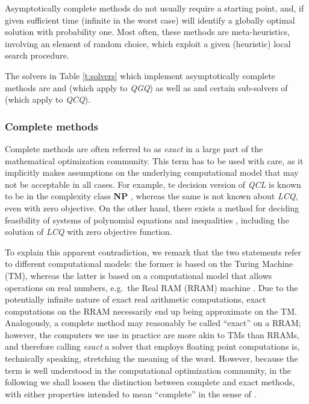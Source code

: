 Asymptotically complete methods do not usually require a starting point, and, if given sufficient time (infinite in the worst case) will identify a globally optimal solution with probability one. Most often, these methods are meta-heuristics, involving an element of random choice, which exploit a given (heuristic) local search procedure.

The solvers in Table \ref{t:solvers} which implement asymptotically complete methods are \oqnlp and \knitro (which apply to \textit{QGQ}) as well as \msnlp and certain sub-solvers of \lgo (which apply to \textit{QCQ}).


\subsubsection{Complete methods}\label{s:complete}

Complete methods are often referred to as \emph{exact} in a large part of the mathematical optimization community. This term has to be used with care, as it implicitly makes assumptions on the underlying computational model that may not be acceptable in all cases. For example, te decision version of \textit{QCL} is known to be in the complexity class \textbf{NP} \cite{vavasis90a}, whereas the same is not known about \textit{LCQ}, even with zero objective. On the other hand, there exists a method for deciding feasibility of systems of polynomial equations and inequalities \cite{tarski-reals}, including the solution of \textit{LCQ} with zero objective function.

To explain this apparent contradiction, we remark that the two statements refer to different computational models: the former is based on the Turing Machine (TM), whereas the latter is based on a computational model that allows operations on real numbers, e.g.~the Real RAM (RRAM) machine \cite{blum}. Due to the potentially infinite nature of exact real arithmetic computations, exact computations on the RRAM necessarily end up being approximate on the TM. Analogously, a complete method may reasonably be called ``exact'' on a RRAM; however, the computers we use in practice are more akin to TMs than RRAMs, and therefore calling \emph{exact} a solver that employs floating point computations is, technically speaking, stretching the meaning of the word. However, because the term is well understood in the computational optimization community, in the following we shall loosen the distinction between complete and exact methods, with either properties intended to mean ``complete'' in the sense of \cite{neumaier}.

